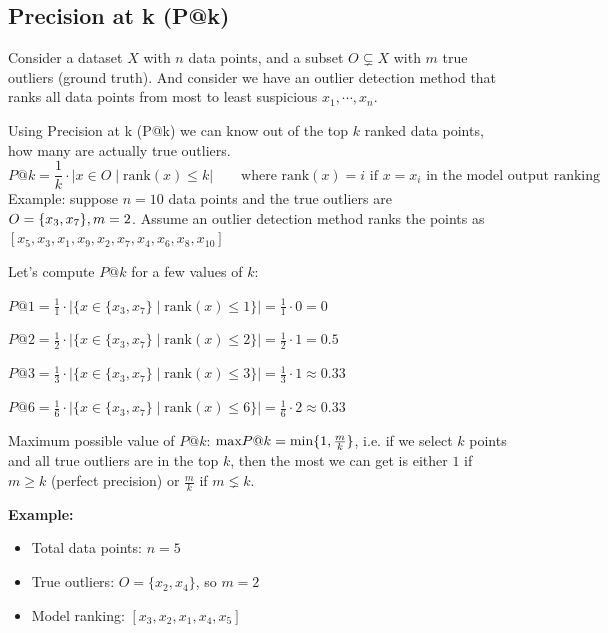 \documentclass{article}
\begin{document}

\subsection*{Precision at k (P@k)}
Consider a dataset $X$ with $n$ data points, and a subset $O \subsetneq X$ with $m$ true outliers (ground truth). And consider we have an outlier detection method that ranks all data points from most to least suspicious $x_1, \cdots ,x_n$.

Using Precision at k (P@k) we can know out of the top $k$ ranked data points, how many are actually true outliers.
\[
P@k = \frac{1}{k} \cdot | x \in O \mid \text{rank}(x) \leq k | \qquad \text{where rank}(x) = i \text{ if }x=x_i \text{ in the model output ranking}
\]
Example: suppose $n=10$ data points and the true outliers are $O = \{x_3, x_7\}, m=2$. Assume an outlier detection method ranks the points as $[x_5, x_3, x_1, x_9, x_2, x_7, x_4, x_6, x_8, x_{10}]$

Let’s compute $P@k$ for a few values of $k$:

$P@1 = \frac{1}{1} \cdot \left| \{x \in \{x_3, x_7\} \mid \text{rank}(x) \leq 1 \} \right| = \frac{1}{1} \cdot 0 = 0$

$P@2 = \frac{1}{2} \cdot \left| \{x \in \{x_3, x_7\} \mid \text{rank}(x) \leq 2 \} \right| = \frac{1}{2} \cdot 1 = 0.5$

$P@3 = \frac{1}{3} \cdot \left| \{x \in \{x_3, x_7\} \mid \text{rank}(x) \leq 3 \} \right| = \frac{1}{3} \cdot 1 \approx 0.33$

$P@6 = \frac{1}{6} \cdot \left| \{x \in \{x_3, x_7\} \mid \text{rank}(x) \leq 6 \} \right| = \frac{1}{6} \cdot 2 \approx 0.33$

Maximum possible value of $P@k$: $\text{max}P@k = \text{min}\{1, \frac{m}{k}\}$, i.e. if we select $k$ points and all true outliers are in the top $k$, then the most we can get is either $1$ if $m \geq k$ (perfect precision) or $\frac{m}{k}$ if $m \lneq k$.

\textbf{Example:}
\begin{itemize}
  \item Total data points: $n = 5$
  \item True outliers: $O = \{x_2, x_4\}$, so $m = 2$
  \item Model ranking: $[x_3, x_2, x_1, x_4, x_5]$
\end{itemize}
\end{document}
